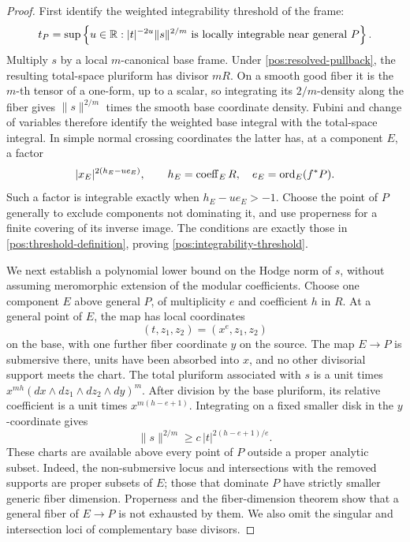 \begin{proof}
First identify the weighted integrability threshold of the frame:
\begin{equation}\label{pos:integrability-threshold}
 t_P=\sup\left\{u\in\mathbb{R}:
 |t|^{-2u}\|s\|^{2/m}\text{ is locally integrable near general }P
 \right\}.
\end{equation}
Multiply \(s\) by a local \(m\)-canonical base frame. Under
\eqref{pos:resolved-pullback}, the resulting total-space
pluriform has divisor \(mR\). On a smooth good fiber it is the
\(m\)-th tensor of a one-form, up to a scalar, so integrating its
\(2/m\)-density along the fiber gives \(\|s\|^{2/m}\) times the
smooth base coordinate density. Fubini and change of variables
therefore identify the weighted base integral with the total-space
integral. In simple normal crossing coordinates the latter has, at
a component \(E\), a factor
\[
 |x_E|^{2(h_E-u e_E)},\qquad
 h_E=\operatorname{coeff}_E R,\quad e_E=\operatorname{ord}_E(f^*P).
\]
Such a factor is integrable exactly when \(h_E-u e_E>-1\).
Choose the point of \(P\) generally to exclude components not
dominating it, and use properness for a finite covering of its inverse
image. The conditions are exactly those in
\eqref{pos:threshold-definition}, proving
\eqref{pos:integrability-threshold}.

We next establish a polynomial lower bound on the Hodge norm of
\(s\), without assuming meromorphic extension of the modular
coefficients. Choose one component \(E\) above general \(P\), of
multiplicity \(e\) and coefficient \(h\) in \(R\). At a general
point of \(E\), the map has local coordinates
\[
 (t,z_1,z_2)=(x^e,z_1,z_2)
\]
on the base, with one further fiber coordinate \(y\) on the source.
The map \(E\to P\) is submersive there, units have been absorbed
into \(x\), and no other divisorial support meets the chart. The
total pluriform associated with \(s\) is a unit times
\(x^{mh}(dx\wedge dz_1\wedge dz_2\wedge dy)^m\).
After division by the base pluriform, its relative coefficient is
a unit times \(x^{m(h-e+1)}\). Integrating on a fixed smaller disk
in the \(y\)-coordinate gives
\begin{equation}\label{pos:polynomial-lower-bound}
 \|s\|^{2/m}\geq c\,|t|^{2(h-e+1)/e}.
\end{equation}
These charts are available above every point of \(P\) outside a
proper analytic subset. Indeed, the non-submersive locus and
intersections with the removed supports are proper subsets of \(E\);
those that dominate \(P\) have strictly smaller generic fiber
dimension. Properness and the fiber-dimension theorem show that a
general fiber of \(E\to P\) is not exhausted by them. We also omit
the singular and intersection loci of complementary base divisors.


\end{proof}
